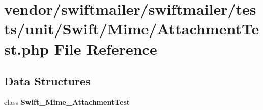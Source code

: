 \section{vendor/swiftmailer/swiftmailer/tests/unit/\+Swift/\+Mime/\+Attachment\+Test.php File Reference}
\label{_attachment_test_8php}
\subsection*{Data Structures}
\begin{DoxyCompactItemize}
\item 
class {\bf Swift\+\_\+\+Mime\+\_\+\+Attachment\+Test}
\end{DoxyCompactItemize}
